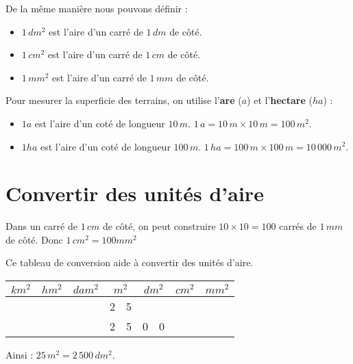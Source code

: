 \begin{pageCours}
\begin{minipage}{0.49\linewidth}
\begin{Rq}
De la même manière nous pouvons définir :
\begin{itemize}[leftmargin=*]
\item $1\,dm^2$ est l'aire d'un carré de $1\,dm$ de côté.
\item $1\,cm^2$ est l'aire d'un carré de $1\,cm$ de côté.
\item $1\,mm^2$ est l'aire d'un carré de $1\,mm$ de côté.
\end{itemize}
\end{Rq}
 
\end{minipage}
\hfill
\begin{minipage}{0.49\linewidth}



\begin{VocU}
Pour mesurer la superficie des terrains, on utilise l'\textbf{are} ($a$) et l'\textbf{hectare} ($ha$) :
\begin{itemize}[leftmargin=*]
\item $1 a$ est l'aire d'un coté de longueur $10\,m$. $1\,a=10\,m \times 10\,m = 100\,m^2$. 
\item $1 ha$ est l'aire d'un coté de longueur $100\,m$. $1\,ha=100\,m \times 100\,m =10\,000\,m^2$. 
\end{itemize}
\end{VocU}
\end{minipage} 

\section{Convertir des unités d'aire}

\begin{Pp}
Dans un carré de $1 \,cm$ de côté, on peut construire $10\times10=100$ carrés de $1\, mm$ de côté.
Donc $1 \,cm^2 = 100 mm^2$
\end{Pp}

\begin{Mt}
Ce tableau de conversion aide à convertir des unités d'aire.

\begin{center}
\begin{tabular}{|M{.5cm}|M{.5cm}||M{.5cm}|M{.5cm}||M{.5cm}|M{.5cm}||M{.5cm}|M{.5cm}||M{.5cm}|M{.5cm}||M{.5cm}|M{.5cm}||M{.5cm}|M{.5cm}|}
 &  &  &  &  &  &  \\\hline
 & & & & & & 2 & 5 & & & & & &  \\\hline
  & & & & & & 2 & 5 & 0 & 0 & & & & \\\hline
\end{tabular}
\end{center}

Ainsi : $25\,m^2=2\,500\,dm^2$.
\end{Mt}
 
\end{pageCours} 
 
